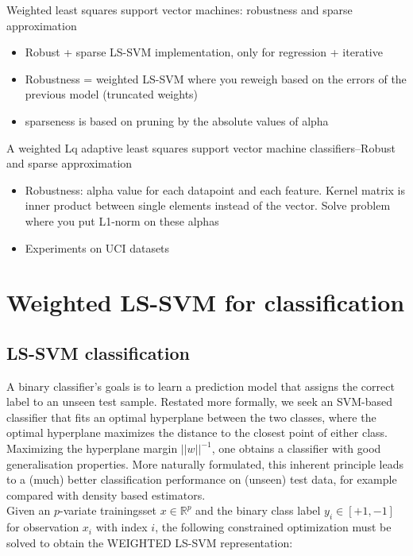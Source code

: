 \documentclass[preprint,12pt]{elsarticle}
\begin{document}
Weighted least squares support vector machines: robustness and sparse approximation~\cite{suykens2002weighted}
\begin{itemize}
	\item Robust + sparse LS-SVM implementation, only for regression + iterative
	\item Robustness = weighted LS-SVM where you reweigh based on the errors of the previous model (truncated weights)
	\item sparseness is based on pruning by the absolute values of alpha
\end{itemize}

A weighted Lq adaptive least squares support vector machine classifiers--Robust and sparse approximation~\cite{liu2011weighted}
\begin{itemize}
	\item Robustness: alpha value for each datapoint and each feature. Kernel matrix is inner product between single elements instead of the vector. Solve problem where you put L1-norm on these alphas
	\item Experiments on UCI datasets
\end{itemize}



\section{Weighted LS-SVM for classification}
\subsection{LS-SVM classification}
A binary classifier's goals is to learn a prediction model that assigns the correct label to an unseen test sample. Restated more formally, we seek an SVM-based classifier that fits an optimal hyperplane between the two classes, where the optimal hyperplane maximizes the distance to the closest point of either class. Maximizing the hyperplane margin $||w||^{-1}$, one obtains a classifier with good generalisation properties. More naturally formulated, this inherent principle leads to a (much) better classification performance on (unseen) test data, for example compared with density based estimators. \\


Given an $p$-variate trainingsset $x \in \mathbb{R}^p$ and the binary class label $y_i \in[+1,-1]$ for observation $x_i$ with index $i$, the following constrained optimization must be solved to obtain the WEIGHTED LS-SVM representation:
\end{document}
